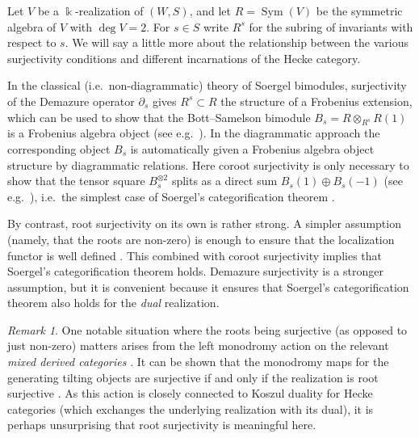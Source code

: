 \documentclass{amsart}
\theoremstyle{plain}
\theoremstyle{definition}
\theoremstyle{remark}
\newtheorem{rem}[thm]{Remark}
\numberwithin{equation}{section}
\newcommand{\defnemph}[1]{\emph{#1}}
\DeclareMathOperator{\Sym}{Sym}
\begin{document}

Let $V$ be a $\Bbbk$-realization of $(W,S)$, and let $R=\Sym(V)$ be the symmetric algebra of $V$ with $\deg V=2$. 
For $s \in S$ write $R^s$ for the subring of invariants with respect to $s$. 
We will say a little more about the relationship between the various surjectivity conditions and different incarnations of the Hecke category. 

In the classical (i.e.~non-diagrammatic) theory of Soergel bimodules, surjectivity of the Demazure operator $\partial_s$ gives $R^s \subset R$ the structure of a Frobenius extension, which can be used to show that the Bott--Samelson bimodule $B_s=R \otimes_{R^s} R(1)$ is a Frobenius algebra object (see e.g.~\cite[Lemma~8.27]{emtw}).
In the diagrammatic approach the corresponding object $B_s$ is automatically given a Frobenius algebra object structure by diagrammatic relations. 
Here coroot surjectivity is only necessary to show that the tensor square $B_s^{\otimes 2}$ splits as a direct sum $B_s(1) \oplus B_s(-1)$ (see e.g.~\cite[(5.14)]{EW-SoergelCalc}), i.e.~the simplest case of Soergel's categorification theorem \cite[Theorem~11.1]{emtw}.

By contrast, root surjectivity on its own is rather strong. 
A simpler assumption (namely, that the roots are non-zero) is enough to ensure that the localization functor is well defined \cite{ew-loccalc}.
This combined with coroot surjectivity implies that Soergel's categorification theorem holds.
Demazure surjectivity is a stronger assumption, but it is convenient because it ensures that Soergel's categorification theorem also holds for the \emph{dual} realization.

\begin{rem}
One notable situation where the roots being surjective (as opposed to just non-zero) matters arises from the left monodromy action on the relevant \defnemph{mixed derived categories} \cite[\S 2.3]{amrw-koszulduality}. 
It can be shown that the monodromy maps for the generating tilting objects are surjective if and only if the realization is root surjective \cite[Example~4.7.4]{amrw-freemonodromic}. 
As this action is closely connected to Koszul duality for Hecke categories (which exchanges the underlying realization with its dual), it is perhaps unsurprising that root surjectivity is meaningful here. 
\end{rem}
\end{document}
